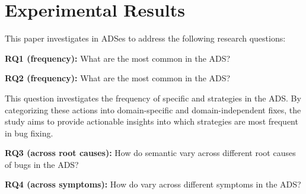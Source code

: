 \section{Experimental Results}\label{sec:evaluation}

This paper investigates \bfps in ADSes to address the following research questions:

\vspace{-1.5mm}
\framed
    \vspace{-2mm}
    \noindent
    \textbf{RQ1 (\Bfp frequency):} What are the most common \bfps in the ADS?
    \vspace{-2mm}
\endframed
\vspace{-1.5mm}



\vspace{-1.5mm}
\framed
    \vspace{-2mm}
    \noindent
    \textbf{RQ2 (\Bfa frequency):} What are the most common \bfas in the ADS?
    \vspace{-2mm}
\endframed
\vspace{-1.5mm}

This question investigates the frequency of specific \bfas and strategies in the ADS. By categorizing these actions into domain-specific and domain-independent fixes, the study aims to provide actionable insights into which strategies are most frequent in bug fixing.

\vspace{-1.5mm}
\framed
    \vspace{-2mm}
    \noindent
    \textbf{RQ3 (\Bfps across root causes):} How do semantic \bfps vary across different root causes of bugs in the ADS?
    \vspace{-2mm}
\endframed
\vspace{-1.5mm}


\vspace{-1.5mm}
\framed
    \vspace{-2mm}
    \noindent
    \textbf{RQ4 (\Bfps across symptoms):} How do  \bfps vary across different symptoms in the ADS?
    \vspace{-2mm}
\endframed
\vspace{-1.5mm}

